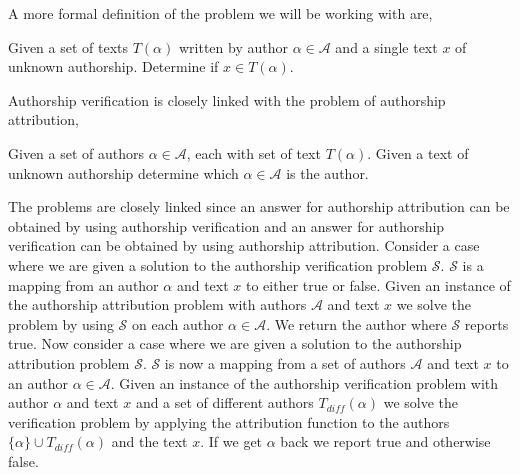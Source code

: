
A more formal definition of the problem we will be working with are,

\begin{definition}

    Given a set of texts $T(\alpha)$ written by author $\alpha \in \mathcal{A}$
    and a single text $x$ of unknown authorship. Determine if $x \in T(\alpha)$.

\end{definition}

Authorship verification is closely linked with the problem of authorship
attribution,

\begin{definition}

    Given a set of authors $\alpha \in \mathcal{A}$, each with set of text
    $T(\alpha)$. Given a text of unknown authorship determine which $\alpha \in
    \mathcal{A}$ is the author.

\end{definition}

The problems are closely linked since an answer for authorship attribution
can be obtained by using authorship verification and an answer for authorship
verification can be obtained by using authorship attribution. Consider a
case where we are given a solution to the authorship verification problem
$\mathcal{S}$. $\mathcal{S}$ is a mapping from an author $\alpha$ and text
$x$ to either true or false. Given an instance of the authorship attribution
problem with authors $\mathcal{A}$ and text $x$ we solve the problem by using
$\mathcal{S}$ on each author $\alpha \in \mathcal{A}$. We return the author
where $\mathcal{S}$ reports true. Now consider a case where we are given a
solution to the authorship attribution problem $\mathcal{S}$. $\mathcal{S}$ is
now a mapping from a set of authors $\mathcal{A}$ and text $x$ to an author
$\alpha \in \mathcal{A}$. Given an instance of the authorship verification
problem with author $\alpha$ and text $x$ and a set of different authors
$T_{diff}(\alpha)$ we solve the verification problem by applying the
attribution function to the authors $\{\alpha\} \cup T_{diff}(\alpha)$
and the text $x$. If we get $\alpha$ back we report true and otherwise false.
